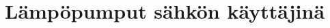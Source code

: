 \documentclass{tauthesis}
\begin{document}
\chapter{Lämpöpumput sähkön käyttäjinä}
\label{ch:pumput_sahkon_kayttajina}


%

\printbibliography[heading=bibintoc]



%

\end{document}
